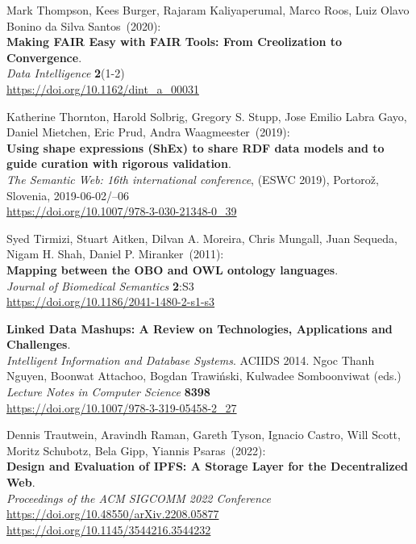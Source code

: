 \begin{thebibliography}{9}
Mark Thompson, Kees Burger, Rajaram Kaliyaperumal, Marco Roos, Luiz Olavo Bonino da Silva Santos~(2020): \\
\textbf{Making FAIR Easy with FAIR Tools: From Creolization to Convergence}.\\
\emph{Data Intelligence} \textbf{2}(1-2)\\
\url{https://doi.org/10.1162/dint_a_00031}

Katherine Thornton, Harold Solbrig, Gregory S. Stupp, Jose Emilio Labra Gayo, Daniel Mietchen, Eric Prud, Andra Waagmeester~(2019): \\
\textbf{Using shape expressions ({ShEx}) to share {RDF} data models and
to guide curation with rigorous validation}. \\
\emph{The Semantic Web: 16th international conference}, (ESWC 2019), Portorož, Slovenia,
2019-06-02/--06\\
\url{https://doi.org/10.1007/978-3-030-21348-0_39}


Syed Tirmizi, Stuart Aitken, Dilvan A. Moreira, Chris Mungall, Juan Sequeda, Nigam H. Shah, Daniel P. Miranker~(2011): \\
\textbf{Mapping between the {OBO} and {OWL} ontology languages}. \\
\emph{Journal of Biomedical Semantics} \textbf{2}:S3 \\
\url{https://doi.org/10.1186/2041-1480-2-s1-s3}

\textbf{Linked Data Mashups: A Review on Technologies, Applications and Challenges}. \\
\emph{Intelligent Information and Database Systems}. ACIIDS 2014. Ngoc Thanh Nguyen, Boonwat Attachoo, Bogdan Trawiński, Kulwadee Somboonviwat (eds.)\\
\emph{Lecture Notes in Computer Science} \textbf{8398}\\
\url{https://doi.org/10.1007/978-3-319-05458-2_27}

Dennis Trautwein, Aravindh Raman, Gareth Tyson, Ignacio Castro, Will Scott, Moritz Schubotz, Bela Gipp, Yiannis Psaras~(2022): \\
\textbf{Design and Evaluation of IPFS: A Storage Layer for the Decentralized Web}.\\
\emph{Proceedings of the {ACM} {SIGCOMM} 2022 Conference}\\
\url{https://doi.org/10.48550/arXiv.2208.05877}\\
\url{https://doi.org/10.1145/3544216.3544232}


\end{thebibliography}
